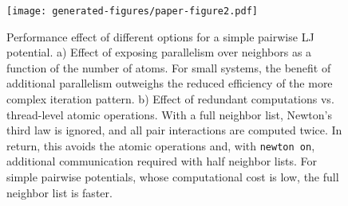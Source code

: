 \documentclass[anonymous,sigconf,9pt]{acmart}
\begin{document}
\begin{figure}[tbph]
\else
\texttt{[image: generated-figures/paper-figure2.pdf]}
\fi
\caption{Performance effect of different options for a simple pairwise LJ potential. a) Effect of exposing parallelism over neighbors as a function of the number of atoms. For small systems, the benefit of additional parallelism outweighs the reduced efficiency of the more complex iteration pattern. b) Effect of redundant computations vs. thread-level atomic operations. With a full neighbor list, Newton's third law is ignored, and all pair interactions are computed twice. In return, this avoids the atomic operations and, with \texttt{newton on}, additional communication required with half neighbor lists. For simple pairwise potentials, whose computational cost is low, the full neighbor list is faster.}\label{fig:pair}
\end{figure}
\end{document}
